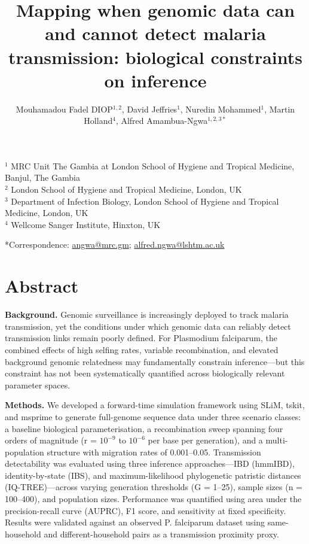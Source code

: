 \documentclass[
  11pt,
]{article}
\title{\textbf{Mapping when genomic data can and cannot detect malaria
transmission: biological constraints on inference}}
\author{}
\date{\vspace{-2.5em}}
\begin{document}
\maketitle

\vspace{1mm}

\author{
Mouhamadou Fadel DIOP$^{1,2}$,
David Jeffries$^{1}$,
Nuredin Mohammed$^{1}$,
Martin Holland$^{4}$,
Alfred Amambua-Ngwa$^{1,2,3*}$
}

\noindent
$^{1}$ MRC Unit The Gambia at London School of Hygiene and Tropical Medicine, Banjul, The Gambia\\
$^{2}$ London School of Hygiene and Tropical Medicine, London, UK\\
$^{3}$ Department of Infection Biology, London School of Hygiene and Tropical Medicine, London, UK\\
$^{4}$ Wellcome Sanger Institute, Hinxton, UK
 
\vspace{5mm}
*Correspondence: \href{mailto:angwa@mrc.gm}{angwa@mrc.gm}; \href{mailto:alfred.ngwa@lshtm.ac.uk}{alfred.ngwa@lshtm.ac.uk}

\newpage

\section{Abstract}\label{abstract}

\textbf{Background.} Genomic surveillance is increasingly deployed to
track malaria transmission, yet the conditions under which genomic data
can reliably detect transmission links remain poorly defined. For
Plasmodium falciparum, the combined effects of high selfing rates,
variable recombination, and elevated background genomic relatedness may
fundamentally constrain inference---but this constraint has not been
systematically quantified across biologically relevant parameter spaces.

\textbf{Methods.} We developed a forward-time simulation framework using
SLiM, tskit, and msprime to generate full-genome sequence data under
three scenario classes: a baseline biological parameterisation, a
recombination sweep spanning four orders of magnitude (r = \(10^{-9}\)
to \(10^{-6}\) per base per generation), and a multi-population
structure with migration rates of 0.001--0.05. Transmission
detectability was evaluated using three inference approaches---IBD
(hmmIBD), identity-by-state (IBS), and maximum-likelihood phylogenetic
patristic distances (IQ-TREE)---across varying generation thresholds (G
= 1--25), sample sizes (n = 100--400), and population sizes. Performance
was quantified using area under the precision-recall curve (AUPRC), F1
score, and sensitivity at fixed specificity. Results were validated
against an observed P. falciparum dataset using same-household and
different-household pairs as a transmission proximity proxy.
\end{document}
